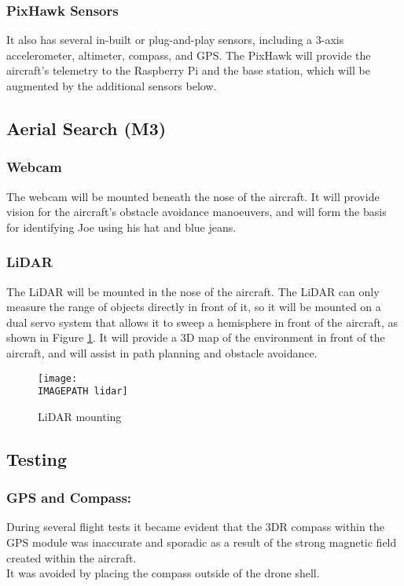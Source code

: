 \subsubsection*{PixHawk Sensors}
It also has several in-built or plug-and-play sensors, including a 3-axis accelerometer, altimeter, compass, and GPS. The PixHawk will provide the aircraft's telemetry to the Raspberry Pi and the base station, which will be augmented by the additional sensors below.

\subsection{Aerial Search (M3)}
\subsubsection*{Webcam}
The webcam will be mounted beneath the nose of the aircraft. It will provide vision for the aircraft's obstacle avoidance manoeuvers, and will form the basis for identifying Joe using his hat and blue jeans.

\subsubsection*{LiDAR}
The LiDAR will be mounted in the nose of the aircraft. The LiDAR can only measure the range of objects directly in front of it, so it will be mounted on a dual servo system that allows it to sweep a hemisphere in front of the aircraft, as shown in Figure \ref{fig:lidar}. It will provide a 3D map of the environment in front of the aircraft, and will assist in path planning and obstacle avoidance.

\begin{figure}[!ht]
	\centering
	\texttt{[image: \\IMAGEPATH lidar]}
	\caption{LiDAR mounting}
	\label{fig:lidar}
\end{figure}

\subsection{Testing}
	
	
	
\subsubsection*{GPS and Compass:}  
During several flight tests it became evident that the 3DR compass within the GPS module was inaccurate and sporadic as a result of the strong magnetic field created within the aircraft.\\

It was avoided by placing the compass outside of the drone shell.